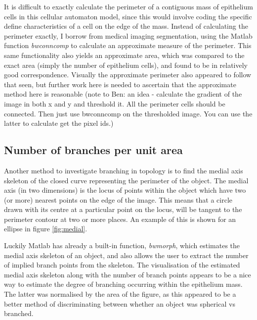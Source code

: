 \documentclass[pdftex,10pt,a4paper]{article}
\begin{document}
It is difficult to exactly calculate the perimeter of a contiguous mass of epithelium cells in this cellular automaton model, since this would involve coding the specific define characteristics of a cell on the edge of the mass. Instead of calculating the perimeter exactly, I borrow from medical imaging segmentation, using the Matlab function \emph{bwconncomp} to calculate an approximate measure of the perimeter. This same functionality also yields an approximate area, which was compared to the exact area (simply the number of epithelium cells), and found to be in relatively good correspondence. Visually the approximate perimeter also appeared to follow that seen, but further work here is needed to ascertain that the approximate method here is reasonable (note to Ben: an idea - calculate the gradient of the image in both x and y and threshold it. All the perimeter cells should be connected. Then just use bwconncomp on the thresholded image. You can use the latter to calculate get the pixel ids.)

\subsection{Number of branches per unit area}\label{sec:branches}
Another method to investigate branching in topology is to find the medial axis skeleton of the closed curve representing the perimeter of the object. The medial axis (in two dimensions) is the locus of points within the object which have two (or more) nearest points on the edge of the image. This means that a circle drawn with its centre at a particular point on the locus, will be tangent to the perimeter contour at two or more places. An example of this is shown for an ellipse in figure \ref{fig:medial}.

Luckily Matlab has already a built-in function, \emph{bwmorph}, which estimates the medial axis skeleton of an object, and also allows the user to extract the number of implied branch points from the skeleton. The visualisation of the estimated medial axis skeleton along with the number of branch points appears to be a nice way to estimate the degree of branching occurring within the epithelium mass. The latter was normalised by the area of the figure, as this appeared to be a better method of discriminating between whether an object was spherical vs branched.
\end{document}

